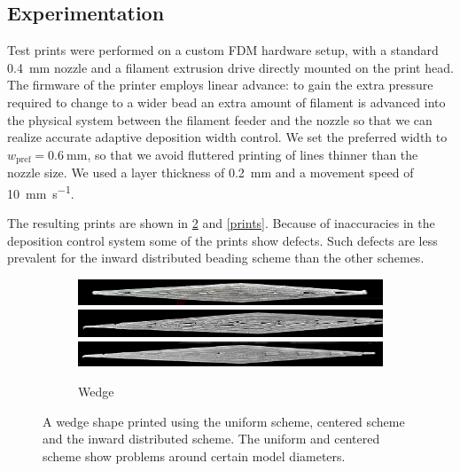 \subsection{Experimentation}
Test prints were performed on a custom FDM hardware setup, with a standard \SI{0.4}{\milli\meter} nozzle and a filament extrusion drive directly mounted on the print head.
The firmware of the printer employs linear advance: to gain the extra pressure required to change to a wider bead an extra amount of filament is advanced into the physical system between the filament feeder and the nozzle so that we can realize accurate adaptive deposition width control.\cite{tronvoll2019investigating}
We set the preferred width to $w_\text{pref} = \SI{0.6}{\milli\meter}$, so that we avoid fluttered printing of lines thinner than the nozzle size.
We used a layer thickness of \SI{0.2}{\milli\meter} and a movement speed of \SI{10}{\milli\meter\per\second}.

The resulting prints are shown in \cref{wedge_print} and \cref{prints}.
Because of inaccuracies in the deposition control system some of the prints show defects.
Such defects are less prevalent for the inward distributed beading scheme than the other schemes.


\begin{figure}
\centering
\begin{subfigure}{\columnwidth}\centering
\setlength{\figwidth}{\columnwidth}
\includegraphics[width=\figwidth]{sources/applications/P3_print_wedge_naive_edited.png}
\includegraphics[width=\figwidth]{sources/applications/P3_print_wedge_center_edited.png}
\includegraphics[width=\figwidth]{sources/applications/P3_print_wedge_inward_edited.png}
\caption{Wedge}\label{print_wedge}
\end{subfigure}
\caption{
A wedge shape printed using the uniform scheme, centered scheme and the inward distributed scheme.
The uniform and centered scheme show problems around certain model diameters.
}
\label{wedge_print}
\end{figure}

